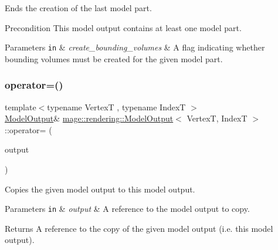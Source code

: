 Ends the creation of the last model part.

\begin{DoxyPrecond}{Precondition}
This model output contains at least one model part. 
\end{DoxyPrecond}

\begin{DoxyParams}[1]{Parameters}
\mbox{\tt in}  & {\em create\+\_\+bounding\+\_\+volumes} & A flag indicating whether bounding volumes must be created for the given model part. \\
\hline
\end{DoxyParams}
\hypertarget{structmage_1_1rendering_1_1_model_output_a902ae401740dbcc886b85977efe7c0da}{}\label{structmage_1_1rendering_1_1_model_output_a902ae401740dbcc886b85977efe7c0da} 
\subsubsection{\texorpdfstring{operator=()}{operator=()}\hspace{0.1cm}{\footnotesize\ttfamily [1/2]}}
{\footnotesize\ttfamily template$<$typename VertexT , typename IndexT $>$ \\
\hyperlink{structmage_1_1rendering_1_1_model_output}{Model\+Output}\& \hyperlink{structmage_1_1rendering_1_1_model_output}{mage\+::rendering\+::\+Model\+Output}$<$ VertexT, IndexT $>$\+::operator= (\begin{DoxyParamCaption}\item[{const \hyperlink{structmage_1_1rendering_1_1_model_output}{Model\+Output}$<$ VertexT, IndexT $>$ \&}]{output }\end{DoxyParamCaption})\hspace{0.3cm}{\ttfamily [delete]}}

Copies the given model output to this model output.


\begin{DoxyParams}[1]{Parameters}
\mbox{\tt in}  & {\em output} & A reference to the model output to copy. \\
\hline
\end{DoxyParams}
\begin{DoxyReturn}{Returns}
A reference to the copy of the given model output (i.\+e. this model output). 
\end{DoxyReturn}
\hypertarget{structmage_1_1rendering_1_1_model_output_a10eb65082a0104be36c51cfc613fd156}{}\label{structmage_1_1rendering_1_1_model_output_a10eb65082a0104be36c51cfc613fd156} 
